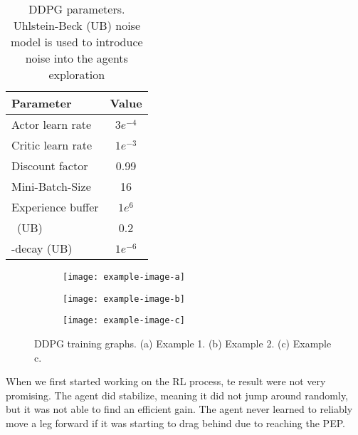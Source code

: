 \begin{table}
	\centering
	\begin{tabular}{| l | c |}
		\hline
		\textbf{Parameter} & \textbf{Value}\\
		\hline
		\hline
		Actor learn rate & $3e^{-4}$ \\
		Critic learn rate & $1e^{-3}$ \\
		Discount factor &  0.99 \\
		Mini-Batch-Size & 16 \\
		Experience buffer & $1e^6$\\
		\textsigma \ (UB) & 0.2 \\
		\textsigma-decay (UB) & $1e^{-6}$ \\
		
		\hline
	\end{tabular}
	\caption[DDPG parameters]{DDPG parameters. Uhlstein-Beck (UB) noise model is used to introduce noise into the agents exploration}
	\label{table: DDPG parameters}
\end{table}


\begin{figure}[h]
	\begin{subfigure}{.5\textwidth} %
		\centering
		\texttt{[image: example-image-a]}  %
		\caption{}
		\label{figure: RL a}
	\end{subfigure}
	\begin{subfigure}{.5\textwidth}
		\centering
		\texttt{[image: example-image-b]}  
		\caption{}
		\label{figure: RL b}
	\end{subfigure} 
	\begin{subfigure}{\textwidth}
		\centering
		\texttt{[image: example-image-c]}   %
		\caption{}
		\label{figure: RL c}
	\end{subfigure}
	\caption[DDPG training graphs]{DDPG training graphs. (a) Example 1. (b) Example 2. (c) Example c.}
	\label{figure: DDPG learning graphs}
\end{figure}



When we first started working on the RL process, te result were not very promising. The agent did stabilize, meaning it did not jump around randomly, but it was not able to find an efficient gain.
The agent never learned to reliably move a leg forward if it was starting to drag behind due to reaching the PEP.


